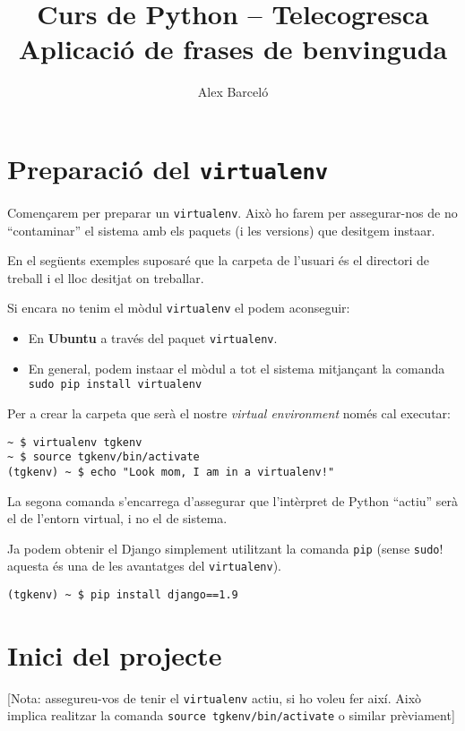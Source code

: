 \documentclass[12pt,a4paper]{article}
\author{Alex Barceló}
\title{Curs de Python -- Telecogresca \\ {\sc Aplicació de frases de benvinguda}}
\begin{document}
\maketitle

\setcounter{section}{-1}
\section{Preparació del \texttt{virtualenv}}

Començarem per preparar un \verb+virtualenv+. Això ho farem per assegurar-nos de no ``contaminar'' el sistema amb els paquets (i les versions) que desitgem insta\lgem{}ar.

En el següents exemples suposaré que la carpeta de l'usuari és el directori de treball i el lloc desitjat on treballar.

Si encara no tenim el mòdul \verb+virtualenv+ el podem aconseguir:
\begin{itemize}
\item En \textbf{Ubuntu} a través del paquet \verb+virtualenv+.
\item En general, podem insta\lgem{}ar el mòdul a tot el sistema mitjançant la comanda \verb+sudo pip install virtualenv+
\end{itemize}

Per a crear la carpeta que serà el nostre \emph{virtual environment} només cal executar:

\begin{verbatim}
~ $ virtualenv tgkenv
~ $ source tgkenv/bin/activate
(tgkenv) ~ $ echo "Look mom, I am in a virtualenv!"
\end{verbatim}

La segona comanda s'encarrega d'assegurar que l'intèrpret de Python ``actiu'' serà el de l'entorn virtual, i no el de sistema.

Ja podem obtenir el Django simplement utilitzant la comanda \verb+pip+ (sense \verb+sudo+! aquesta és una de les avantatges del \verb+virtualenv+).

\begin{verbatim}
(tgkenv) ~ $ pip install django==1.9
\end{verbatim}

\section{Inici del projecte}

[Nota: assegureu-vos de tenir el \verb+virtualenv+ actiu, si ho voleu fer així. Això implica realitzar la comanda \verb+source tgkenv/bin/activate+ o similar prèviament]
\end{document}
